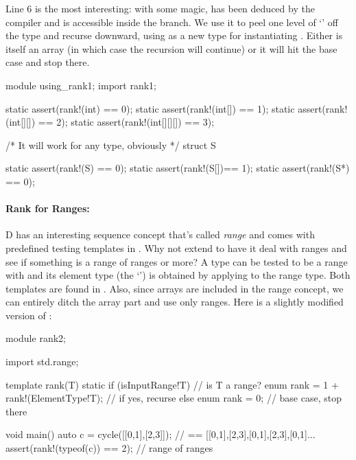 Line 6 is the most interesting: with some  magic,  has been deduced by the compiler and is accessible inside the  branch. We use it to peel one level of `\DD{[]}' off the type and recurse downward, using  as a new type for instantiating . Either  is itself an array (in which case the recursion will continue) or it will hit the base case and stop there.

\begin{dcode}
module using_rank1;
import rank1;

static assert(rank!(int)       == 0);
static assert(rank!(int[])     == 1);
static assert(rank!(int[][])   == 2);
static assert(rank!(int[][][]) == 3);

/* It will work for any type, obviously */
struct S {}

static assert(rank!(S)  == 0);
static assert(rank!(S[])== 1);
static assert(rank!(S*) == 0);
\end{dcode}


\paragraph{Rank for Ranges:}\label{rankforranges}

D has an interesting sequence concept that's called \emph{range} and comes with predefined testing templates in . Why not extend  to have it deal with ranges and see if something is a range of ranges or more? A type can be tested to be a range with  and its element type (the `') is obtained by applying  to the range type. Both templates are found in . Also, since arrays are included in the range concept, we can entirely ditch the array part and use only ranges. Here is a slightly modified version of :

\begin{dcode}
module rank2;

import std.range;

template rank(T)
{
    static if (isInputRange!T)                // is T a range?
        enum rank = 1 + rank!(ElementType!T); // if yes, recurse
    else                                      
        enum rank = 0;                        // base case, stop there
}

void main()
{
    auto c = cycle([[0,1],[2,3]]); // == [[0,1],[2,3],[0,1],[2,3],[0,1]...
    assert(rank!(typeof(c)) == 2); // range of ranges
}
\end{dcode}

